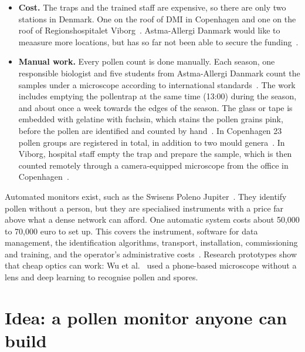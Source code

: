 \begin{itemize}
  \item \textbf{Cost.} The traps and the trained staff are expensive, so there are only two stations in Denmark. One on the roof of DMI in Copenhagen and one on the roof of Regionshospitalet Viborg~\cite{stage2018pollen}. Astma-Allergi Danmark would like to meaasure more locations, but has so far not been able to secure the funding~\cite{stage2018pollen}.
  \item \textbf{Manual work.} Every pollen count is done manually. Each season, one responsible biologist and five students from Astma-Allergi Danmark count the samples under a microscope according to international standards~\cite{stage2018pollen}. The work includes emptying the pollentrap at the same time (13:00) during the season, and about once a week towards the edges of the season. The glass or tape is embedded with gelatine with fuchsin, which stains the pollen grains pink, before the pollen are identified and counted by hand~\cite{stage2018pollen}. In Copenhagen 23 pollen groups are registered in total, in addition to two mould genera~\cite{stage2018pollen}. In Viborg, hospital staff empty the trap and prepare the sample, which is then counted remotely through a camera-equipped microscope from the office in Copenhagen~\cite{stage2018pollen}.
\end{itemize}

Automated monitors exist, such as the Swisens Poleno Jupiter~\cite{SwisensPoleno}. They identify
pollen without a person, but they are specialised instruments with a price far above what a
dense network can afford. One automatic system costs about 50,000 to 70,000 euro to set up.
This covers the instrument, software for data management, the identification algorithms,
transport, installation, commissioning and training, and the operator's administrative
costs~\cite{SwisensCost}. Research prototypes show that cheap optics can work: Wu et
al.~\cite{Wu2018} used a phone-based microscope without a lens and deep learning to recognise
pollen and spores.

\section{Idea: a pollen monitor anyone can build}

